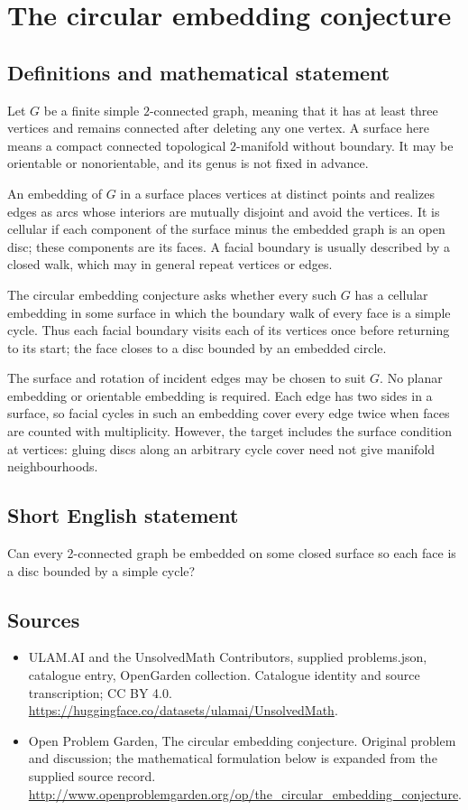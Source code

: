 \documentclass[11pt,a4paper]{article}
\begin{document}
\section*{The circular embedding conjecture}\label{statement}

\subsection{Definitions and mathematical statement}
Let $G$ be a finite simple $2$-connected graph, meaning that
it has at least three vertices and remains connected after
deleting any one vertex. A surface here means a compact
connected topological $2$-manifold without boundary. It may be
orientable or nonorientable, and its genus is not fixed in
advance.

An embedding of $G$ in a surface places vertices at distinct
points and realizes edges as arcs whose interiors are mutually
disjoint and avoid the vertices. It is cellular if each
component of the surface minus the embedded graph is an open
disc; these components are its faces. A facial boundary is
usually described by a closed walk, which may in general
repeat vertices or edges.

The circular embedding conjecture asks whether every such $G$
has a cellular embedding in some surface in which the boundary
walk of every face is a simple cycle. Thus each facial boundary
visits each of its vertices once before returning to its start;
the face closes to a disc bounded by an embedded circle.

The surface and rotation of incident edges may be chosen to
suit $G$. No planar embedding or orientable embedding is
required. Each edge has two sides in a surface, so facial
cycles in such an embedding cover every edge twice when faces
are counted with multiplicity. However, the target includes
the surface condition at vertices: gluing discs along an
arbitrary cycle cover need not give manifold neighbourhoods.
\subsection{Short English statement}
Can every 2-connected graph be embedded on some closed surface so each face is a disc bounded by a simple cycle?
\subsection{Sources}
\begin{itemize}
\item[S1] ULAM.AI and the UnsolvedMath Contributors, supplied problems.json, catalogue entry, OpenGarden collection. Catalogue identity and source transcription; CC BY 4.0.
\url{https://huggingface.co/datasets/ulamai/UnsolvedMath}.
\item[S2] Open Problem Garden, The circular embedding conjecture. Original problem and discussion; the mathematical formulation below is expanded from the supplied source record.
\url{http://www.openproblemgarden.org/op/the_circular_embedding_conjecture}.
\end{itemize}
\end{document}
